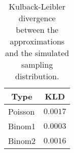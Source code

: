 \begin{table}[tb]
\caption{Kulback-Leibler divergence between the approximations and the simulated sampling distribution.\label{tab:kld}} 
\begin{center}
\begin{tabular}{lr}
\hline\hline
\multicolumn{1}{c}{Type}&\multicolumn{1}{c}{KLD}\tabularnewline
\hline
Poisson&$0.0017$\tabularnewline
Binom1&$0.0003$\tabularnewline
Binom2&$0.0016$\tabularnewline
\hline
\end{tabular}\end{center}
\end{table}
